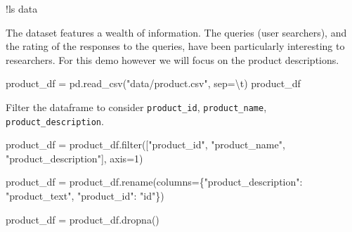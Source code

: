 \documentclass[
  letterpaper,
  DIV=11,
  numbers=noendperiod]{scrreprt}
\newenvironment{Shaded}{\begin{snugshade}}{\end{snugshade}}
\newcommand{\BuiltInTok}[1]{\textcolor[rgb]{0.00,0.23,0.31}{#1}}
\newcommand{\CharTok}[1]{\textcolor[rgb]{0.13,0.47,0.30}{#1}}
\newcommand{\DecValTok}[1]{\textcolor[rgb]{0.68,0.00,0.00}{#1}}
\newcommand{\NormalTok}[1]{\textcolor[rgb]{0.00,0.23,0.31}{#1}}
\newcommand{\OperatorTok}[1]{\textcolor[rgb]{0.37,0.37,0.37}{#1}}
\newcommand{\StringTok}[1]{\textcolor[rgb]{0.13,0.47,0.30}{#1}}
\begin{document}
\begin{Shaded}
\begin{Highlighting}[]
\OperatorTok{!}\NormalTok{ls data}
\end{Highlighting}
\end{Shaded}

The dataset features a wealth of information. The queries (user
searchers), and the rating of the responses to the queries, have been
particularly interesting to researchers. For this demo however we will
focus on the product descriptions.

\begin{Shaded}
\begin{Highlighting}[]
\NormalTok{product\_df }\OperatorTok{=}\NormalTok{ pd.read\_csv(}\StringTok{"data/product.csv"}\NormalTok{, sep}\OperatorTok{=}\StringTok{\textquotesingle{}}\CharTok{\textbackslash{}t}\StringTok{\textquotesingle{}}\NormalTok{)}
\NormalTok{product\_df}
\end{Highlighting}
\end{Shaded}

Filter the dataframe to consider \texttt{product\_id},
\texttt{product\_name}, \texttt{product\_description}.

\begin{Shaded}
\begin{Highlighting}[]
\NormalTok{product\_df }\OperatorTok{=}\NormalTok{ product\_df.}\BuiltInTok{filter}\NormalTok{([}\StringTok{"product\_id"}\NormalTok{, }\StringTok{"product\_name"}\NormalTok{, }\StringTok{"product\_description"}\NormalTok{], axis}\OperatorTok{=}\DecValTok{1}\NormalTok{)}
\end{Highlighting}
\end{Shaded}

\begin{Shaded}
\begin{Highlighting}[]
\NormalTok{product\_df }\OperatorTok{=}\NormalTok{ product\_df.rename(columns}\OperatorTok{=}\NormalTok{\{}\StringTok{"product\_description"}\NormalTok{: }\StringTok{"product\_text"}\NormalTok{, }\StringTok{"product\_id"}\NormalTok{: }\StringTok{"id"}\NormalTok{\})}
\end{Highlighting}
\end{Shaded}

\begin{Shaded}
\begin{Highlighting}[]
\NormalTok{product\_df }\OperatorTok{=}\NormalTok{ product\_df.dropna()}
\end{Highlighting}
\end{Shaded}
\end{document}
